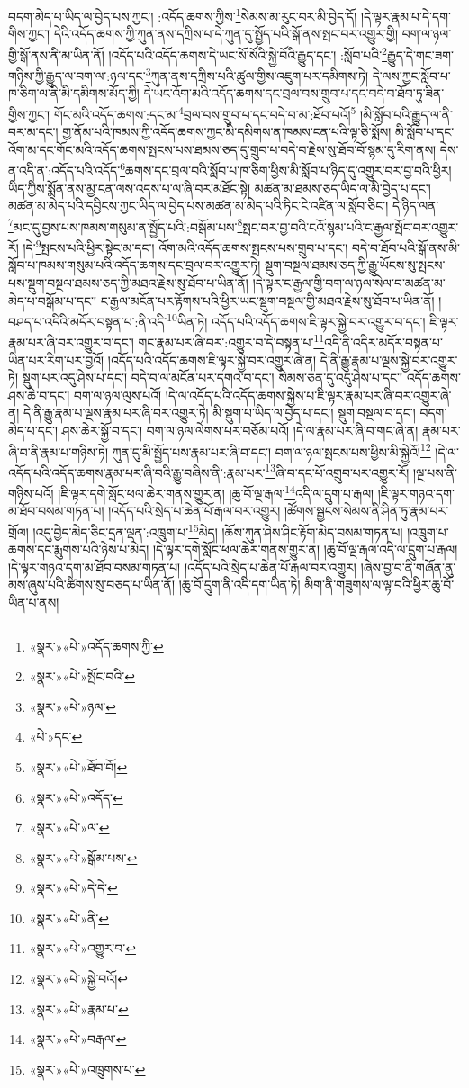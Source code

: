 བདག་མེད་པ་ཡིད་ལ་བྱེད་པས་ཀྱང་། :འདོད་ཆགས་ཀྱིས་\footnote{«སྣར་»«པེ་»འདོད་ཆགས་ཀྱི་}སེམས་མ་རུང་བར་མི་བྱེད་དོ། །དེ་ལྟར་རྣམ་པ་དེ་དག་གིས་ཀྱང་། དེའི་འདོད་ཆགས་ཀྱི་ཀུན་ནས་དཀྲིས་པ་དེ་ཀུན་དུ་སྤྱོད་པའི་སྒོ་ནས་སྤང་བར་འགྱུར་གྱི། བག་ལ་ཉལ་གྱི་སྒོ་ནས་ནི་མ་ཡིན་ནོ། །འདོད་པའི་འདོད་ཆགས་དེ་ཡང་སོ་སོའི་སྐྱེ་བོའི་རྒྱུད་དང་། :སློབ་པའི་\footnote{«སྣར་»«པེ་»སྤོང་བའི་}རྒྱུད་དེ་གང་ཟག་གཉིས་ཀྱི་རྒྱུད་ལ་བག་ལ་:ཉལ་དང་\footnote{«སྣར་»«པེ་»ཉལ་}ཀུན་ནས་དཀྲིས་པའི་ཚུལ་གྱིས་འཇུག་པར་དམིགས་ཏེ། དེ་ལས་ཀྱང་སློབ་པ་ཁ་ཅིག་ལ་ནི་མི་དམིགས་མོད་ཀྱི། དེ་ཡང་འོག་མའི་འདོད་ཆགས་དང་བྲལ་བས་གྲུབ་པ་དང་བདེ་བ་ཐོབ་ཏུ་ཟིན་གྱིས་ཀྱང་། གོང་མའི་འདོད་ཆགས་:དང་མ་\footnote{«པེ་»དང་}བྲལ་བས་གྲུབ་པ་དང་བདེ་བ་མ་:ཐོབ་པའོ།\footnote{«སྣར་»«པེ་»ཐོབ་བོ།} །མི་སློབ་པའི་རྒྱུད་ལ་ནི་བར་མ་དང་། གྱ་ནོམ་པའི་ཁམས་ཀྱི་འདོད་ཆགས་ཀྱང་མི་དམིགས་ན་ཁམས་ངན་པའི་ལྟ་ཅི་སྨོས། མི་སློབ་པ་དང་འོག་མ་དང་གོང་མའི་འདོད་ཆགས་སྤངས་པས་ཐམས་ཅད་དུ་གྲུབ་པ་བདེ་བ་རྗེས་སུ་ཐོབ་བོ་སྙམ་དུ་རིག་ནས། དེས་ན་འདི་ན་:འདོད་པའི་འདོད་\footnote{«སྣར་»«པེ་»འདོད་}ཆགས་དང་བྲལ་བའི་སློབ་པ་ཁ་ཅིག་ཕྱིས་མི་སློབ་པ་ཉིད་དུ་འགྱུར་བར་བྱ་བའི་ཕྱིར། ཡིད་ཀྱིས་སྨོན་ནས་མྱ་ངན་ལས་འདས་པ་ལ་ཞི་བར་མཐོང་སྟེ། མཚན་མ་ཐམས་ཅད་ཡིད་ལ་མི་བྱེད་པ་དང་། མཚན་མ་མེད་པའི་དབྱིངས་ཀྱང་ཡིད་ལ་བྱེད་པས་མཚན་མ་མེད་པའི་ཏིང་ངེ་འཛིན་ལ་སློབ་ཅིང་། དེ་ཉིད་ལན་\footnote{«སྣར་»«པེ་»ལ་}མང་དུ་བྱས་པས་ཁམས་གསུམ་ན་སྤྱོད་པའི་:བསྒོམ་པས་\footnote{«སྣར་»«པེ་»སྒོམ་པས་}སྤང་བར་བྱ་བའི་ངའོ་སྙམ་པའི་ང་རྒྱལ་སྤོང་བར་འགྱུར་རོ། །དེ་\footnote{«སྣར་»«པེ་»དེ་དེ་}སྤངས་པའི་ཕྱིར་སྟེང་མ་དང་། འོག་མའི་འདོད་ཆགས་སྤངས་པས་གྲུབ་པ་དང་། བདེ་བ་ཐོབ་པའི་སྒོ་ནས་མི་སློབ་པ་ཁམས་གསུམ་པའི་འདོད་ཆགས་དང་བྲལ་བར་འགྱུར་ཏེ། སྡུག་བསྔལ་ཐམས་ཅད་ཀྱི་རྒྱུ་ཡོངས་སུ་སྤངས་པས་སྡུག་བསྔལ་ཐམས་ཅད་ཀྱི་མཐའ་རྗེས་སུ་ཐོབ་པ་ཡིན་ནོ། །དེ་ལྟར་ང་རྒྱལ་གྱི་བག་ལ་ཉལ་སེལ་བ་མཚན་མ་མེད་པ་བསྒོམ་པ་དང་། ང་རྒྱལ་མངོན་པར་རྟོགས་པའི་ཕྱིར་ཡང་སྡུག་བསྔལ་གྱི་མཐའ་རྗེས་སུ་ཐོབ་པ་ཡིན་ནོ། །བཤད་པ་འདིའི་མདོར་བསྟན་པ་:ནི་འདི་\footnote{«སྣར་»«པེ་»ནི་}ཡིན་ཏེ། འདོད་པའི་འདོད་ཆགས་ཇི་ལྟར་སྐྱེ་བར་འགྱུར་བ་དང་། ཇི་ལྟར་རྣམ་པར་ཞི་བར་འགྱུར་བ་དང་། གང་རྣམ་པར་ཞི་བར་:འགྱུར་བ་དེ་བསྟན་པ་\footnote{«སྣར་»«པེ་»འགྱུར་བ་}འདི་ནི་འདིར་མདོར་བསྟན་པ་ཡིན་པར་རིག་པར་བྱའོ། །འདོད་པའི་འདོད་ཆགས་ཇི་ལྟར་སྐྱེ་བར་འགྱུར་ཞེ་ན། དེ་ནི་རྒྱུ་རྣམ་པ་ལྔས་སྐྱེ་བར་འགྱུར་ཏེ། སྡུག་པར་འདུ་ཤེས་པ་དང་། བདེ་བ་ལ་མངོན་པར་དགའ་བ་དང་། སེམས་ཅན་དུ་འདུ་ཤེས་པ་དང་། འདོད་ཆགས་ཤས་ཆེ་བ་དང་། བག་ལ་ཉལ་ལུས་པའོ། །དེ་ལ་འདོད་པའི་འདོད་ཆགས་སྐྱེས་པ་ཇི་ལྟར་རྣམ་པར་ཞི་བར་འགྱུར་ཞེ་ན། དེ་ནི་རྒྱུ་རྣམ་པ་ལྔས་རྣམ་པར་ཞི་བར་འགྱུར་ཏེ། མི་སྡུག་པ་ཡིད་ལ་བྱེད་པ་དང་། སྡུག་བསྔལ་བ་དང་། བདག་མེད་པ་དང་། ཤས་ཆེར་སྐྱོ་བ་དང་། བག་ལ་ཉལ་ལེགས་པར་བཅོམ་པའོ། །དེ་ལ་རྣམ་པར་ཞི་བ་གང་ཞེ་ན། རྣམ་པར་ཞི་བ་ནི་རྣམ་པ་གཉིས་ཏེ། ཀུན་དུ་མི་སྤྱོད་པས་རྣམ་པར་ཞི་བ་དང་། བག་ལ་ཉལ་སྤངས་པས་ཕྱིས་མི་སྐྱེའོ།\footnote{«སྣར་»«པེ་»སྐྱེ་བའོ།} །དེ་ལ་འདོད་པའི་འདོད་ཆགས་རྣམ་པར་ཞི་བའི་རྒྱུ་བཞིས་ནི་:རྣམ་པར་\footnote{«སྣར་»«པེ་»རྣམ་པ་}ཞི་བ་དང་པོ་འགྲུབ་པར་འགྱུར་རོ། །ལྔ་པས་ནི་གཉིས་པའོ། །ཇི་ལྟར་དགེ་སློང་ཕལ་ཆེར་གནས་གྱུར་ན། །ཆུ་བོ་ལྔ་རྒལ་\footnote{«སྣར་»«པེ་»བརྒལ་}འདི་ལ་དྲུག་པ་རྒལ། །ཇི་ལྟར་གཉའ་དག་མ་ཐོབ་བསམ་གཏན་པ། །འདོད་པའི་སྲེད་པ་ཆེན་པོ་རྒལ་བར་འགྱུར། །ཚོགས་སྦྱངས་སེམས་ནི་ཤིན་ཏུ་རྣམ་པར་གྲོལ། །འདུ་བྱེད་མེད་ཅིང་དྲན་ལྡན་:འཁྲུག་པ་\footnote{«སྣར་»«པེ་»འཁྲུགས་པ་}མེད། །ཆོས་ཀུན་ཤེས་ཤིང་རྟོག་མེད་བསམ་གཏན་པ། །འཁྲུག་པ་ཆགས་དང་རྨུགས་པའི་ཉེས་པ་མེད། །དེ་ལྟར་དགེ་སློང་ཕལ་ཆེར་གནས་གྱུར་ན། །ཆུ་བོ་ལྔ་རྒལ་འདི་ལ་དྲུག་པ་རྒལ། །དེ་ལྟར་གཉའ་དག་མ་ཐོབ་བསམ་གཏན་པ། །འདོད་པའི་སྲེད་པ་ཆེན་པོ་རྒལ་བར་འགྱུར། །ཞེས་བྱ་བ་ནི་གཞོན་ནུ་མས་ཞུས་པའི་ཚིགས་སུ་བཅད་པ་ཡིན་ནོ། །ཆུ་བོ་དྲུག་ནི་འདི་དག་ཡིན་ཏེ། མིག་ནི་གཟུགས་ལ་ལྟ་བའི་ཕྱིར་ཆུ་བོ་ཡིན་པ་ནས། 